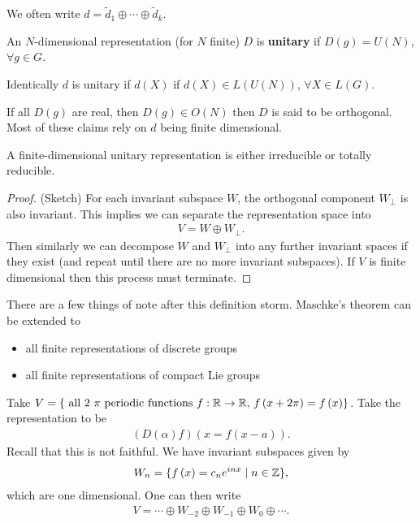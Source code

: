 We often write $d = \widetilde{d}_1 \oplus \cdots \oplus \widetilde{d}_k$.

\begin{definition}
    An $N$-dimensional representation (for $N$ finite) $D$ is \textbf{unitary} if $D \left( g \right) = U \left( N \right) $, $\forall g \in G$.

    Identically $d$ is unitary if $d \left( X \right) $ if $d \left( X \right) \in L \left( U \left( N \right)  \right) $, $\forall X \in L \left( G \right) $.
\end{definition}

If all $D \left( g \right) $ are real, then $D \left( g \right) \in O \left( N \right) $ then $D$ is said to be orthogonal. Most of these claims rely on $d$ being finite dimensional.


\begin{theorem}[ (Maschke)]
    A finite-dimensional unitary representation is either irreducible or totally reducible.
\end{theorem}

\begin{proof}(Sketch)
    For each invariant subspace $W$, the orthogonal component $W_\perp$ is also invariant. This implies we can separate the representation space into
    \begin{align}
        V = W \oplus W_{\perp}
    .\end{align}
    Then similarly we can decompose $W$ and $W_\perp$ into any further invariant spaces if they exist (and repeat until there are no more invariant subspaces). If $V$ is finite dimensional then this process must terminate.
\end{proof}

\begin{note}
    There are a few things of note after this definition storm. Maschke's theorem can be extended to 
    \begin{itemize}
        \item all finite representations of discrete groups
        \item all finite representations of compact Lie groups 
    \end{itemize}
\end{note}

\begin{example}
    Take $V = \{\text{~all 2 $\pi$ periodic functions $f : \mathbb{R} \to \mathbb{R}$, $f \left( x + 2\pi \right)  = f \left( x \right) $}\} $. Take the representation to be
    \begin{align}
        \left( D \left( \alpha \right) f \right) \left( x = f\left( x - a \right)  \right) 
    .\end{align}
    Recall that this is not faithful. We have invariant subspaces given by
    \begin{align}
        W_n = \{f \left( x \right) = c_n e^{inx}  \mid n \in \mathbb{Z}\} 
    ,\end{align}
    which are one dimensional. One can then write
    \begin{align}
        V = \cdots \oplus W_{-2} \oplus W_{-1} \oplus W_0 \oplus \cdots
    .\end{align}
\end{example}


